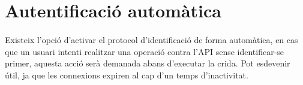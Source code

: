 \section{Autentificació automàtica}

    \paragraph{}
    Existeix l’opció d'activar el protocol d'identificació de forma automàtica, en cas que un usuari intenti realitzar una operació contra l’API sense identificar-se primer, aquesta acció serà demanada abans d’executar la crida. Pot esdevenir útil, ja que les connexions expiren al cap d'un temps d'inactivitat.
